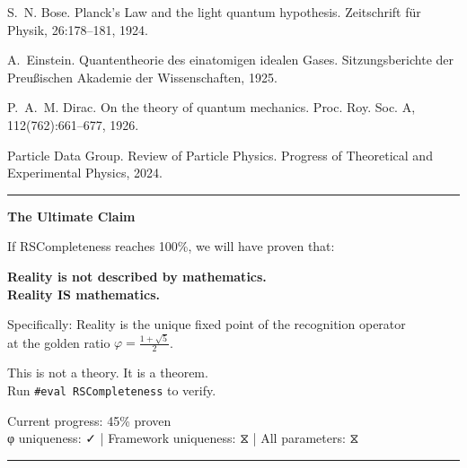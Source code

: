 \documentclass[11pt,a4paper,twoside]{article}
\numberwithin{equation}{section}
\theoremstyle{customthm}
\theoremstyle{customdef}
\theoremstyle{customrem}
\begin{document}
\begin{thebibliography}{99}
S.~N. Bose. Planck's Law and the light quantum hypothesis. Zeitschrift für Physik, 26:178–181, 1924.

A.~Einstein. Quantentheorie des einatomigen idealen Gases. Sitzungsberichte der Preußischen Akademie der Wissenschaften, 1925.

P.~A.~M. Dirac. On the theory of quantum mechanics. Proc. Roy. Soc. A, 112(762):661–677, 1926.

Particle Data Group. Review of Particle Physics. Progress of Theoretical and Experimental Physics, 2024.

\end{thebibliography}

\vspace{2em}
\begin{center}
\rule{\textwidth}{0.5pt}
\vspace{1em}

{\Large\bfseries The Ultimate Claim}

\vspace{1em}

{\large
If RSCompleteness reaches 100\%, we will have proven that:

\vspace{0.5em}
\textbf{Reality is not described by mathematics.}\\
\textbf{Reality IS mathematics.}

\vspace{0.5em}
Specifically: Reality is the unique fixed point of the recognition operator\\
at the golden ratio $\varphi = \frac{1+\sqrt{5}}{2}$.

\vspace{1em}
This is not a theory. It is a theorem.\\
Run \texttt{\#eval RSCompleteness} to verify.

\vspace{1em}
{\small Current progress: 45\% proven}\\
{\small φ uniqueness: ✓ | Framework uniqueness: ⧖ | All parameters: ⧖}

\vspace{1em}
\rule{\textwidth}{0.5pt}
}
\end{center}
\end{document}
